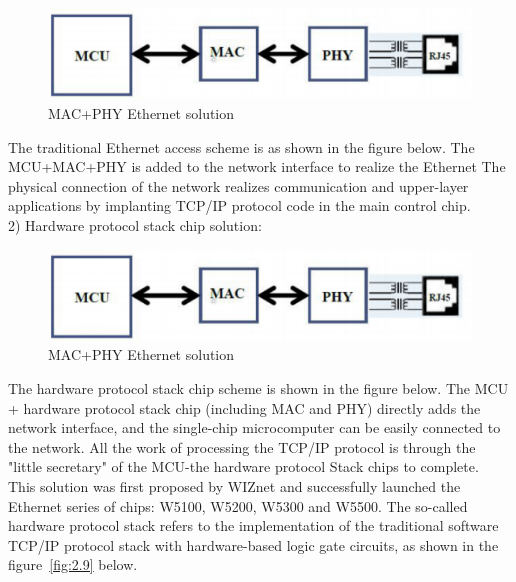 \begin{figure}[!ht]
	\centering
	\includegraphics[width=13cm]{grafiken/2.7.pdf}
	\caption{MAC+PHY Ethernet solution} 
	\label{fig:2.7}
\end{figure}
\FloatBarrier
The traditional Ethernet access scheme is as shown in the figure below. The MCU+MAC+PHY is added to the network interface to realize the Ethernet
The physical connection of the network realizes communication and upper-layer applications by implanting TCP/IP protocol code in the main control chip.
\\
2) Hardware protocol stack chip solution: 
\begin{figure}[!ht]
	\centering
	\includegraphics[width=13cm]{grafiken/2.7.pdf}
	\caption{MAC+PHY Ethernet solution} 
	\label{fig:2.8}
\end{figure}
\FloatBarrier
The hardware protocol stack chip scheme is shown in the figure below. The MCU + hardware protocol stack chip (including MAC and PHY) directly adds the network interface, and the single-chip microcomputer can be easily connected to the network. All the work of processing the TCP/IP protocol is through the "little secretary" of the MCU-the hardware protocol Stack chips to complete.
\\
This solution was first proposed by WIZnet and successfully launched the Ethernet series of chips: W5100, W5200, W5300 and W5500. The so-called hardware protocol stack refers to the implementation of the traditional software TCP/IP protocol stack with hardware-based logic gate circuits, as shown in the figure~\ref{fig:2.9} below.
